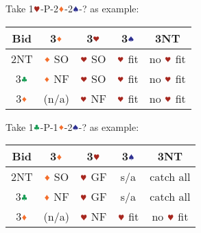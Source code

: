 \documentclass{article}
\begin{document}
\begin{multicols}{2}
\begin{CJK*}{UTF8}{gt}
\noindent Take 1$\hhh$-P-2$\ddd$-2$\sss$-? as example: \\
\begin{tabular}{c|c|c|c|c}
    \hline
    Bid & 3$\ddd$ & 3$\hhh$ & 3$\sss$ & 3NT \\ \hline\hline
    2NT & $\ddd$ SO & $\hhh$ SO & $\hhh$ fit & no $\hhh$ fit \\ \hline
    3$\ccc$ & $\ddd$ NF & $\hhh$ SO & $\hhh$ fit & no $\hhh$ fit \\ \hline
    3$\ddd$ & (n/a) & $\hhh$ NF & $\hhh$ fit & no $\hhh$ fit \\ \hline
\end{tabular}

\noindent Take 1$\ccc$-P-1$\ddd$-2$\sss$-? as example: \\
\begin{tabular}{c|c|c|c|c}
    \hline
    Bid & 3$\ddd$ & 3$\hhh$ & 3$\sss$ & 3NT \\ \hline\hline
    2NT & $\ddd$ SO & $\hhh$ GF & s/a & catch all \\ \hline
    3$\ccc$ & $\ddd$ NF & $\hhh$ GF & s/a & catch all \\ \hline
    3$\ddd$ & (n/a) & $\hhh$ NF & $\hhh$ fit & no $\hhh$ fit \\ \hline
\end{tabular}


\end{CJK*}
\end{multicols}
\end{document}
